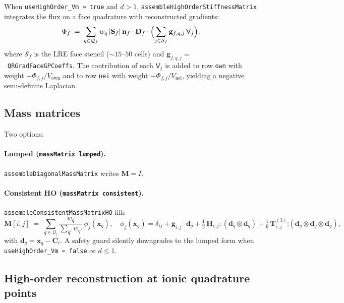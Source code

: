 \documentclass[11pt,a4paper]{article}
\newcommand{\code}[1]{\texttt{\small #1}}
\newcommand{\Dten}{\mathbf{D}}
\newcommand{\Mmass}{\mathbf{M}}
\begin{document}
When \code{useHighOrder\_Vm = true} and $d>1$,
\code{assembleHighOrderStiffnessMatrix} integrates the flux on a face
quadrature with reconstructed gradients:
\begin{equation}
  \Phi_{f} \;=\;
   \sum_{q \in \mathcal{Q}_{f}}
       w_{q}\, \lvert \mathbf{S}_{f} \rvert\,
       \mathbf{n}_{f} \cdot \Dten_{f} \cdot
       \Bigl(
         \sum_{j \in \mathcal{S}_{f}}
            \mathbf{g}_{f,q,j}\, \mathsf{V}_{j}
       \Bigr),
   \label{eq:HO-flux}
\end{equation}
where $\mathcal{S}_{f}$ is the LRE face stencil ($\sim 15$--$50$ cells)
and $\mathbf{g}_{f,q,j} = $~\code{QRGradFaceGPCoeffs}. The
contribution of each $\mathsf{V}_{j}$ is added to row \code{own} with
weight $+\Phi_{f,j}/V_{\text{own}}$ and to row \code{nei} with weight
$-\Phi_{f,j}/V_{\text{nei}}$, yielding a negative semi-definite
Laplacian.

\subsection{Mass matrices}

Two options:
\paragraph{Lumped (\code{massMatrix lumped}).}
\code{assembleDiagonalMassMatrix} writes $\Mmass = I$.

\paragraph{Consistent HO (\code{massMatrix consistent}).}
\code{assembleConsistentMassMatrixHO} fills
\begin{equation}
  \Mmass[i, j] \;=\;
   \sum_{q \in \mathcal{Q}_{i}}
       \frac{w_{q}}{\sum_{q'} w_{q'}}\,
       \phi_{j}(\mathbf{x}_{q}),
   \quad
   \phi_{j}(\mathbf{x}_{q})
    = \delta_{ij}
    + \mathbf{g}_{i,j} \cdot \mathbf{d}_{q}
    + \tfrac{1}{2}\, \mathbf{H}_{i,j} \!:\! (\mathbf{d}_{q} \otimes \mathbf{d}_{q})
    + \tfrac{1}{6}\, \mathbf{T}^{(3)}_{i,j} \!\vdots\!
        (\mathbf{d}_{q} \otimes \mathbf{d}_{q} \otimes \mathbf{d}_{q}),
   \label{eq:HO-mass}
\end{equation}
with $\mathbf{d}_{q} = \mathbf{x}_{q} - \mathbf{C}_{i}$. A safety guard
silently downgrades to the lumped form when
\code{useHighOrder\_Vm = false} or $d \le 1$.

\subsection{High-order reconstruction at ionic quadrature points}
\end{document}
